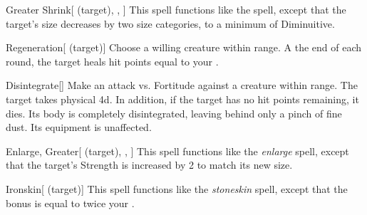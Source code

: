 \lowercase{\hypertarget{spell:Greater Shrink}{}}\label{spell:Greater Shrink}
\begin{attuneability}[\nth{4}]{\hypertarget{spell:Greater Shrink}{Greater Shrink}}[ (target), , ]
This spell functions like the  spell, except that the target's size decreases by two size categories, to a minimum of Diminuitive.
\end{attuneability}
\vspace{0.25em}



\lowercase{\hypertarget{spell:Regeneration}{}}\label{spell:Regeneration}
\begin{attuneability}[\nth{4}]{\hypertarget{spell:Regeneration}{Regeneration}}[ (target)]
Choose a willing creature within \rngclose range.
A the end of each round, the target heals hit points equal to your .
\end{attuneability}
\vspace{0.25em}



\lowercase{\hypertarget{spell:Disintegrate}{}}\label{spell:Disintegrate}
\begin{apability}[\nth{5}]{\hypertarget{spell:Disintegrate}{Disintegrate}}[]
Make an attack vs. Fortitude against a creature within \rngmed range.
\hit The target takes physical  \plus4d.
In addition, if the target has no hit points remaining, it dies.
Its body is completely disintegrated, leaving behind only a pinch of fine dust.
Its equipment is unaffected.
\end{apability}
\vspace{0.25em}



\lowercase{\hypertarget{spell:Enlarge, Greater}{}}\label{spell:Enlarge, Greater}
\begin{attuneability}[\nth{5}]{\hypertarget{spell:Enlarge, Greater}{Enlarge, Greater}}[ (target), , ]
This spell functions like the \textit{enlarge} spell, except that the target's Strength is increased by 2 to match its new size.
\end{attuneability}
\vspace{0.25em}



\lowercase{\hypertarget{spell:Ironskin}{}}\label{spell:Ironskin}
\begin{attuneability}[\nth{6}]{\hypertarget{spell:Ironskin}{Ironskin}}[ (target)]
This spell functions like the \textit{stoneskin} spell, except that the bonus is equal to twice your .
\end{attuneability}
\vspace{0.25em}



